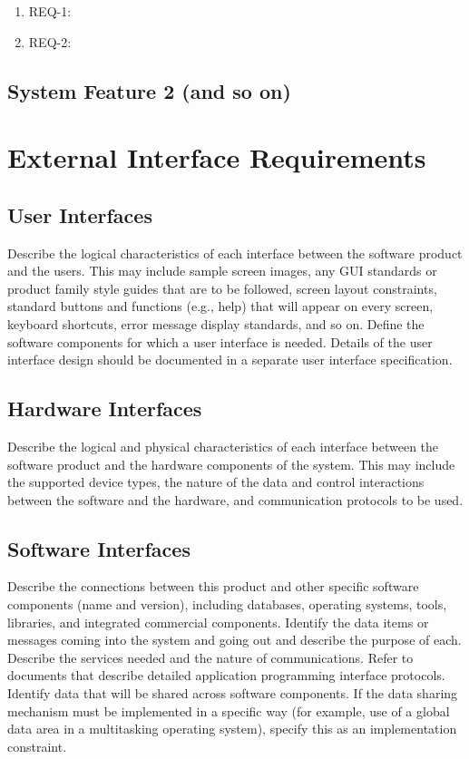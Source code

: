 \documentclass[12pt,oneside,letterpaper]{article}
\begin{document}
\begin{enumerate}
\item REQ-1:
\item REQ-2:
\end{enumerate}

\subsection{System Feature 2 (and so on)}

\section{External Interface Requirements}
\subsection{User Interfaces}
Describe the logical characteristics of each interface between the software product and the users. This may include sample screen images, any GUI standards or product family style guides that are to be followed, screen layout constraints, standard buttons and functions (e.g., help) that will appear on every screen, keyboard shortcuts, error message display standards, and so on. Define the software components for which a user interface is needed. Details of the user interface design should be documented in a separate user interface specification.
\subsection{Hardware Interfaces}
Describe the logical and physical characteristics of each interface between the software product and the hardware components of the system. This may include the supported device types, the nature of the data and control interactions between the software and the hardware, and communication protocols to be used.
\subsection{Software Interfaces}
Describe the connections between this product and other specific software components (name and version), including databases, operating systems, tools, libraries, and integrated commercial components. Identify the data items or messages coming into the system and going out and describe the purpose of each. Describe the services needed and the nature of communications. Refer to documents that describe detailed application programming interface protocols. Identify data that will be shared across software components. If the data sharing mechanism must be implemented in a specific way (for example, use of a global data area in a multitasking operating system), specify this as an implementation constraint.
\end{document}
